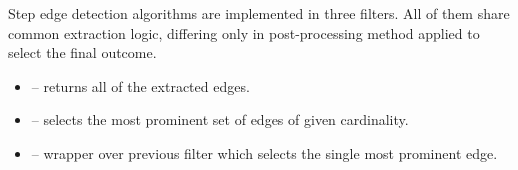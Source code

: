 \begin{refImpl}
Step edge detection algorithms are implemented in three \studio filters. All of them share common extraction logic, differing only in post-processing method applied to select the final outcome.
\begin{itemize}
	\item {} -- returns all of the extracted edges.
	\item {} -- selects the most prominent set of edges of given cardinality.
	\item {} -- wrapper over previous filter which selects the single most prominent edge.
\end{itemize} 
\end{refImpl}

